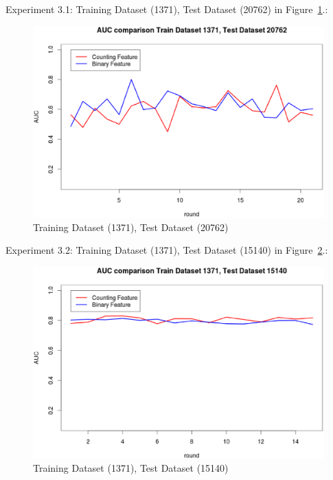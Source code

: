 \documentclass{sig-alternate}
\begin{document}
Experiment 3.1: Training Dataset  (1371), Test Dataset  (20762) in Figure~\ref{fig:fig6}.:
\begin{figure}[h]
\centering
\includegraphics[width=\columnwidth]{1371_20762.eps}
\caption{ Training Dataset  (1371), Test Dataset  (20762)}
\label{fig:fig6}
\end{figure}

Experiment 3.2: Training Dataset  (1371), Test Dataset  (15140) in Figure~\ref{fig:fig7}.:
\begin{figure}[h]
\centering
\includegraphics[width=\columnwidth]{1371_15140.eps}
\caption{Training Dataset  (1371), Test Dataset  (15140)}
\label{fig:fig7}
\end{figure}
\end{document}
